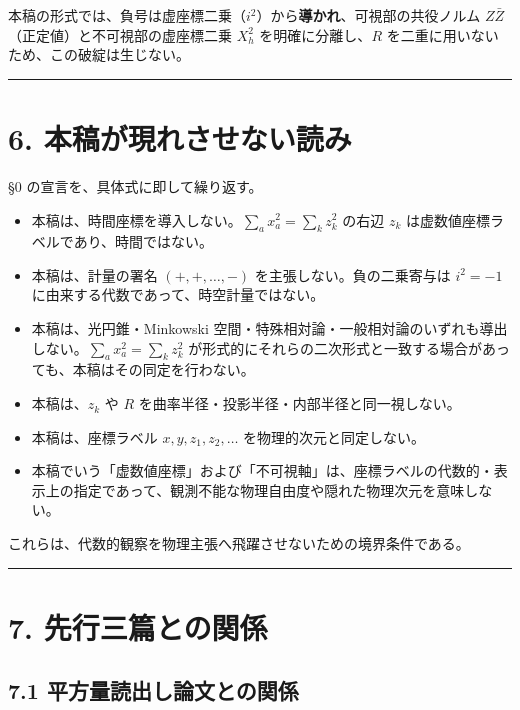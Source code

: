 \documentclass[11pt,a4paper]{ltjsarticle}
\providecommand{\tightlist}{\setlength{\itemsep}{0pt}\setlength{\parskip}{0pt}}
\begin{document}
本稿の形式では、負号は虚座標二乗（\(i^2\)）から\textbf{導かれ}、可視部の共役ノルム
\(Z\bar Z\)（正定値）と不可視部の虚座標二乗 \(X_h^2\)
を明確に分離し、\(R\) を二重に用いないため、この破綻は生じない。

\begin{center}\rule{0.5\linewidth}{0.5pt}\end{center}

\section{6.
本稿が現れさせない読み}\label{ux672cux7a3fux304cux73feux308cux3055ux305bux306aux3044ux8aadux307f}

§0 の宣言を、具体式に即して繰り返す。

\begin{itemize}
\tightlist
\item
  本稿は、時間座標を導入しない。\(\sum_a x_a^2=\sum_k z_k^2\) の右辺
  \(z_k\) は虚数値座標ラベルであり、時間ではない。
\item
  本稿は、計量の署名 \((+,+,\dots,-)\) を主張しない。負の二乗寄与は
  \(i^2=-1\) に由来する代数であって、時空計量ではない。
\item
  本稿は、光円錐・Minkowski
  空間・特殊相対論・一般相対論のいずれも導出しない。\(\sum_a x_a^2=\sum_k z_k^2\)
  が形式的にそれらの二次形式と一致する場合があっても、本稿はその同定を行わない。
\item
  本稿は、\(z_k\) や \(R\)
  を曲率半径・投影半径・内部半径と同一視しない。
\item
  本稿は、座標ラベル \(x,y,z_1,z_2,\dots\) を物理的次元と同定しない。
\item
  本稿でいう「虚数値座標」および「不可視軸」は、座標ラベルの代数的・表示上の指定であって、観測不能な物理自由度や隠れた物理次元を意味しない。
\end{itemize}

これらは、代数的観察を物理主張へ飛躍させないための境界条件である。

\begin{center}\rule{0.5\linewidth}{0.5pt}\end{center}

\section{7.
先行三篇との関係}\label{ux5148ux884cux4e09ux7bc7ux3068ux306eux95a2ux4fc2}

\subsection{7.1
平方量読出し論文との関係}\label{ux5e73ux65b9ux91cfux8aadux51faux3057ux8ad6ux6587ux3068ux306eux95a2ux4fc2}
\end{document}
